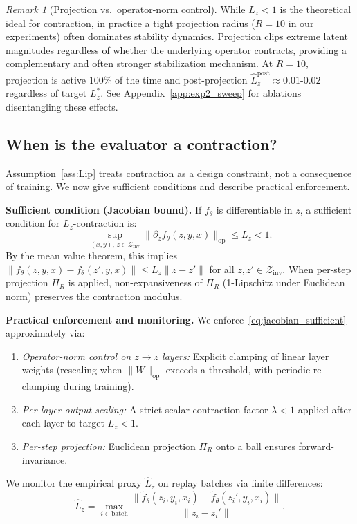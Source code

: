 \documentclass{article}
\theoremstyle{plain}
\theoremstyle{definition}
\theoremstyle{remark}
\newtheorem{remark}[theorem]{Remark}
\begin{document}
{\begin{remark}[Projection vs.\ operator-norm control]
\label{rem:projection_vs_contraction}
While $L_z < 1$ is the theoretical ideal for contraction, in practice a tight projection radius ($R{=}10$ in our experiments) often dominates stability dynamics. Projection clips extreme latent magnitudes regardless of whether the underlying operator contracts, providing a complementary and often stronger stabilization mechanism. At $R{=}10$, projection is active 100\% of the time and post-projection $\hat{L}_z^{\text{post}} \approx 0.01$-$0.02$ regardless of target $L^*_z$. See Appendix~\ref{app:exp2_sweep} for ablations disentangling these effects.
\end{remark}

\subsection{When is the evaluator a contraction?}
\label{sec:when_contraction}

Assumption~\ref{ass:Lip} treats contraction as a design constraint, not a consequence of training.
We now give sufficient conditions and describe practical enforcement.

\textbf{Sufficient condition (Jacobian bound).}
If $f_\theta$ is differentiable in $z$, a sufficient condition for $L_z$-contraction is:
\begin{equation}
\sup_{(x,y),\, z\in\mathcal{Z}_{\mathrm{inv}}}\|\partial_z f_\theta(z,y,x)\|_{\mathrm{op}} \le L_z < 1.
\label{eq:jacobian_sufficient}
\end{equation}
By the mean value theorem, this implies $\|f_\theta(z,y,x)-f_\theta(z',y,x)\|\le L_z\|z-z'\|$ for all $z,z'\in\mathcal{Z}_{\mathrm{inv}}$.
When per-step projection $\Pi_R$ is applied, non-expansiveness of $\Pi_R$ (1-Lipschitz under Euclidean norm) preserves the contraction modulus.

\textbf{Practical enforcement and monitoring.}
We enforce~\eqref{eq:jacobian_sufficient} approximately via:
\begin{enumerate}
\item \emph{Operator-norm control on $z\!\to\!z$ layers:} Explicit clamping of linear layer weights (rescaling when $\|W\|_{\mathrm{op}}$ exceeds a threshold, with periodic re-clamping during training).
\item \emph{Per-layer output scaling:} A strict scalar contraction factor $\lambda<1$ applied after each layer to target $L_z<1$.
\item \emph{Per-step projection:} Euclidean projection $\Pi_R$ onto a ball ensures forward-invariance.
\end{enumerate}
We monitor the empirical proxy $\hat L_z$ on replay batches via finite differences:
\begin{equation}
\hat L_z = \max_{i\in\text{batch}} \frac{\|\tilde f_\theta(z_i,y_i,x_i) - \tilde f_\theta(z_i',y_i,x_i)\|}{\|z_i - z_i'\|}.
\label{eq:Lz_empirical}
\end{equation}

}
\end{document}
